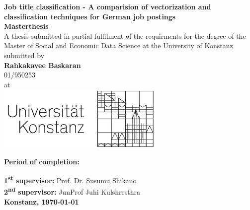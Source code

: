 \documentclass[12pt, a4paper, titlepage]{article}
\begin{document}
\begin{titlepage}
    \begin{center}
    {\LARGE \textbf{Job title classification - A comparision of vectorization and classification techniques for German job postings}}
    \\[1cm]
    {\Large \textbf{Masterthesis}}
    \\[1cm]
    {\normalsize A thesis submitted in partial fulfilment of the requirments for the degree of the Master of Social and Economic Data Science at the University of Konstanz}
    \\[1cm]
    {\Large submitted by}
    \\[0.5cm]
    {\LARGE \textbf{Rahkakavee Baskaran}}
    \\[0.5cm]
    {\LARGE 01/950253}
    \\[0.5cm]
    {\Large at}
    \\[0.5cm]
    \includegraphics[width=0.6\textwidth]{logo.jpg}
  \end{center}
  {\normalsize \textbf{Period of completion: }} 
  \\[0.2cm]
  \begin{center}
  {\normalsize \textbf{1\textsuperscript{st} supervisor:} Prof. Dr. Susumu Shikano}
  \\[0.1cm]
  {\normalsize \textbf{2\textsuperscript{nd} supervisor:} JunProf Juhi Kulshresthra}
  \\[2cm]
    {\LARGE \textbf{Konstanz, \today}}
  \end{center}
    \end{titlepage}

\tableofcontents
\newpage
\listoffigures
\newpage
\listoftables
\newpage
\end{document}
